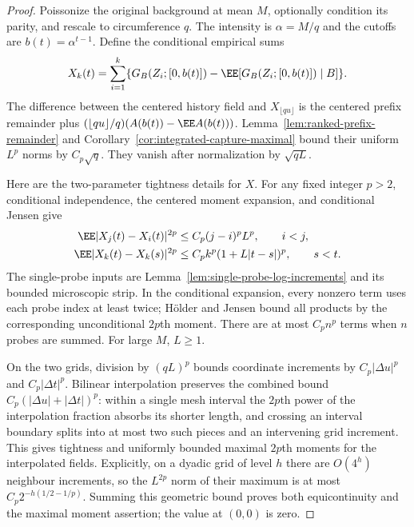 \documentclass[11pt,letterpaper]{article}
\begin{document}
\begin{proof}
Poissonize the original background at mean $M$, optionally
condition its parity, and rescale to circumference $q$.
The intensity is $\alpha=M/q$ and the cutoffs are
$b(t)=\alpha^{t-1}$. Define the conditional empirical sums
\[
 X_k(t)=\sum_{i=1}^k
       \{G_B(Z_i;[0,b(t)])-\EE[G_B(Z_i;[0,b(t)])\mid B]\}.
\]
The difference between the centered history field and
$X_{\lfloor qu\rfloor}$ is the centered prefix remainder
plus $(\lfloor qu\rfloor/q)(A(b(t))-\EE A(b(t)))$.
Lemma~\ref{lem:ranked-prefix-remainder} and
Corollary~\ref{cor:integrated-capture-maximal} bound their
uniform $L^p$ norms by $C_p\sqrt q$.
They vanish after normalization by $\sqrt{qL}$.

Here are the two-parameter tightness details for $X$.
For any fixed integer $p>2$, conditional independence,
the centered moment expansion, and conditional Jensen give
\begin{align*}
 \EE|X_j(t)-X_i(t)|^{2p}
       &\le C_p(j-i)^p L^p,\qquad i<j,\\
 \EE|X_k(t)-X_k(s)|^{2p}
       &\le C_pk^p(1+L|t-s|)^p,\qquad s<t.
\end{align*}
The single-probe inputs are
Lemma~\ref{lem:single-probe-log-increments} and its bounded
microscopic strip. In the conditional expansion, every
nonzero term uses each probe index at least twice; H\"older
and Jensen bound all products by the corresponding
unconditional $2p$th moment. There are at most $C_pn^p$
terms when $n$ probes are summed. For large $M$, $L\ge1$.

On the two grids, division by $(qL)^p$ bounds coordinate
increments by $C_p|\Delta u|^p$ and $C_p|\Delta t|^p$.
Bilinear interpolation preserves the combined bound
$C_p(|\Delta u|+|\Delta t|)^p$: within a single mesh interval
the $2p$th power of the interpolation fraction absorbs its
shorter length, and crossing an interval boundary splits
into at most two such pieces and an intervening grid increment.
This gives tightness and uniformly bounded maximal $2p$th
moments for the interpolated fields.
Explicitly, on a dyadic grid of level $h$ there are $O(4^h)$
neighbour increments, so the $L^{2p}$ norm of their maximum
is at most $C_p2^{-h(1/2-1/p)}$.
Summing this geometric bound proves both equicontinuity and
the maximal moment assertion; the value at $(0,0)$ is zero.


\end{proof}
\end{document}

